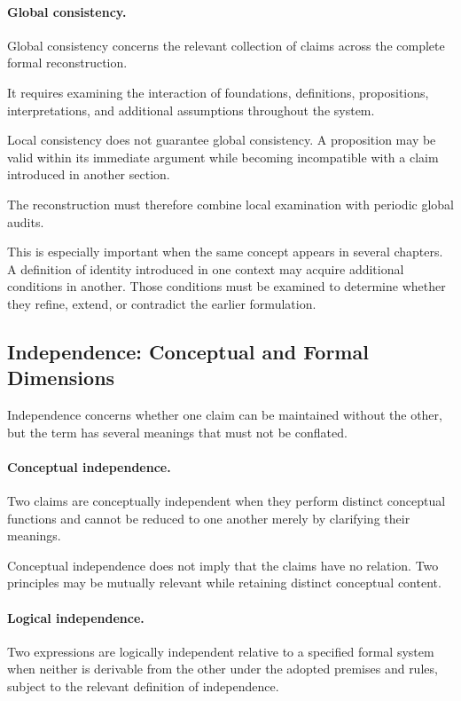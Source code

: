 \paragraph{Global consistency.}

Global consistency concerns the relevant collection of
claims across the complete formal reconstruction.

It requires examining the interaction of foundations,
definitions, propositions, interpretations, and additional
assumptions throughout the system.

Local consistency does not guarantee global consistency.
A proposition may be valid within its immediate argument
while becoming incompatible with a claim introduced in
another section.

The reconstruction must therefore combine local examination
with periodic global audits.

This is especially important when the same concept appears
in several chapters. A definition of identity introduced
in one context may acquire additional conditions in another.
Those conditions must be examined to determine whether they
refine, extend, or contradict the earlier formulation.

\subsection{Independence: Conceptual and Formal Dimensions}

Independence concerns whether one claim can be maintained
without the other, but the term has several meanings that
must not be conflated.

\paragraph{Conceptual independence.}

Two claims are conceptually independent when they perform
distinct conceptual functions and cannot be reduced to
one another merely by clarifying their meanings.

Conceptual independence does not imply that the claims
have no relation. Two principles may be mutually relevant
while retaining distinct conceptual content.

\paragraph{Logical independence.}

Two expressions are logically independent relative to
a specified formal system when neither is derivable from
the other under the adopted premises and rules, subject
to the relevant definition of independence.

